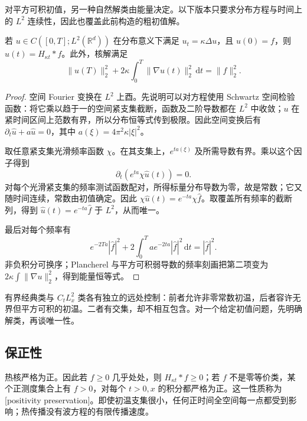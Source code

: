 \ProseParagraphBreak

对平方可积初值，另一种自然解类由能量决定。以下版本只要求分布方程与时间上的 \(L^2\) 连续性，因此也覆盖此前构造的粗初值解。

\begin{theorem}[平方可积解的唯一性]\label{b2:thm:12-l2-uniqueness}
若 \(u\in C([0,T];L^2(\mathbb R^d))\) 在分布意义下满足 \(u_t=\kappa\Delta u\)，且 \(u(0)=f\)，则 \(u(t)=H_{\kappa t}*f\)。此外，核解满足
\begin{equation}\label{b2:eq:12-whole-energy}
 \|u(T)\|_2^2+2\kappa\int_0^T\|\nabla u(t)\|_2^2\,\mathrm{d}t
 =\|f\|_2^2.
\end{equation}
\end{theorem}
\begin{proof}
空间 Fourier 变换在 \(L^2\) 上酉。先说明可以对方程使用 Schwartz 空间检验函数：将它乘以趋于一的空间紧支集截断，函数及二阶导数都在 \(L^2\) 中收敛；\(u\) 在紧时间区间上范数有界，所以分布恒等式传到极限。因此空间变换后有 \(\partial_t\widehat u+a\widehat u=0\)，其中 \(a(\xi)=4\pi^2\kappa|\xi|^2\)。

取任意紧支集光滑频率函数 \(\chi\)。在其支集上，\(e^{ta(\xi)}\) 及所需导数有界。乘以这个因子得到
\[
 \partial_t\left(e^{ta}\chi\widehat u(t)\right)=0.
\]
对每个光滑紧支集的频率测试函数配对，所得标量分布导数为零，故是常数；它又随时间连续，常数由初值确定。因此 \(\chi\widehat u(t)=e^{-ta}\chi\widehat f\)。取覆盖所有频率的截断列，得到 \(\widehat u(t)=e^{-ta}\widehat f\) 于 \(L^2\)，从而唯一。

最后对每个频率有
\[
 e^{-2Ta}|\widehat f|^2
 +2\int_0^Tae^{-2ta}|\widehat f|^2\,\mathrm{d}t
 =|\widehat f|^2.
\]
非负积分可换序；Plancherel 与平方可积弱导数的频率刻画把第二项变为 \(2\kappa\int\|\nabla u\|_2^2\)，得到能量恒等式。
\end{proof}

有界经典类与 \(C_tL^2_x\) 类各有独立的远处控制：前者允许非零常数初温，后者容许无界但平方可积的初温。二者有交集，却不相互包含。对一个给定初值问题，先明确解类，再谈唯一性。

\subsection{保正性}
\label{b2:subsec:120304}

热核严格为正。因此若 \(f\geq0\) 几乎处处，则 \(H_{\kappa t}*f\geq0\)；若 \(f\) 不是零等价类，某个正测度集合上有 \(f>0\)，对每个 \(t>0,x\) 的积分都严格为正。这一性质称为[positivity preservation]。即使初温支集很小，任何正时间全空间每一点都受到影响；热传播没有波方程的有限传播速度。

